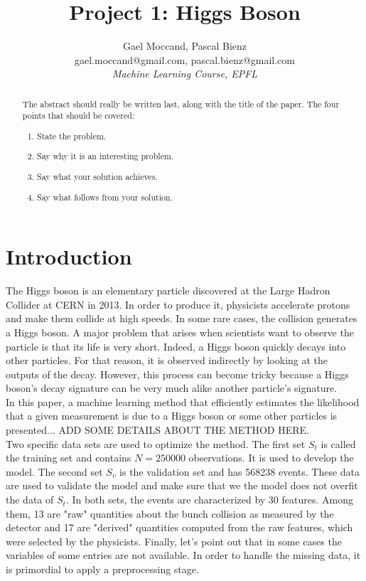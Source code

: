 \documentclass[10pt,conference,compsocconf]{IEEEtran}
\begin{document}
\title{Project 1: Higgs Boson}

\author{
  Gael Moccand, Pascal Bienz\\
  gael.moccand@gmail.com, pascal.bienz@gmail.com\\
  \textit{Machine Learning Course, EPFL}
}

\maketitle

\begin{abstract}
The abstract should really be written last, along with the title of
the paper. The four points that should be covered:
\begin{enumerate}
\item State the problem.
\item Say why it is an interesting problem.
\item Say what your solution achieves.
\item Say what follows from your solution.
\end{enumerate}
\end{abstract}

\section{Introduction}
The Higgs boson is an elementary particle discovered at the Large Hadron Collider at CERN in 2013. In order to produce it, physicists accelerate protons and make them collide at high speeds. In some rare cases, the collision generates a Higgs boson. A major problem that arises when scientists want to observe the particle is that its life is very short. Indeed, a Higgs boson quickly decays into other particles. For that reason, it is observed indirectly by looking at the outputs of the decay. However, this process can become tricky because a Higgs boson's decay signature can be very much alike another particle's signature.\\
In this paper, a machine learning method that efficiently estimates the likelihood that a given measurement is due to a Higgs boson or some other particles is presented... ADD SOME DETAILS ABOUT THE METHOD HERE.\\
Two specific data sets are used to optimize the method. The first set $S_{t}$ is called the training set and contains $N=250000$ observations. It is used to develop the model. The second set $S_{v}$ is the validation set and has 568238 events. These data are used to validate the model and make sure that we the model does not overfit the data of $S_t$. In both sets, the events are characterized by 30 features. Among them, 13 are "raw" quantities about the bunch collision as measured by the detector and 17 are "derived" quantities computed from the raw features, which were selected by the physicists. Finally, let's point out that in some cases the variables of some entries are not available. In order to handle the missing data, it is primordial to apply a preprocessing stage.
\end{document}
